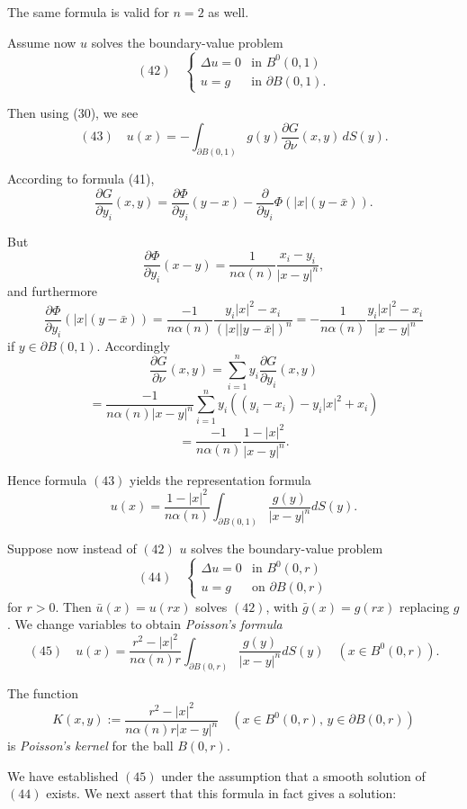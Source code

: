 The same formula is valid for $n = 2$ as well.

Assume now $u$ solves the boundary-value problem
$$(42) \quad \begin{cases} \Delta u = 0 & \text{in } B^0(0,1) \\ u = g & \text{in } \partial B(0,1). \end{cases}$$

Then using (30), we see
$$(43) \quad u(x) = -\int_{\partial B(0,1)} g(y) \frac{\partial G}{\partial \nu}(x, y) \, dS(y).$$

According to formula (41),
$$\frac{\partial G}{\partial y_i}(x, y) = \frac{\partial \Phi}{\partial y_i}(y - x) - \frac{\partial}{\partial y_i}\Phi(|x|(y - \bar{x})).$$

But
$$\frac{\partial \Phi}{\partial y_i}(x - y) = \frac{1}{n\alpha(n)} \frac{x_i - y_i}{|x - y|^n},$$
and furthermore
$$\frac{\partial \Phi}{\partial y_i}(|x|(y - \bar{x})) = \frac{-1}{n\alpha(n)} \frac{y_i|x|^2 - x_i}{(|x||y - \bar{x}|)^n} = -\frac{1}{n\alpha(n)} \frac{y_i|x|^2 - x_i}{|x - y|^n}$$
if $y \in \partial B(0, 1)$. Accordingly
$$\frac{\partial G}{\partial \nu}(x, y) = \sum_{i=1}^{n} y_i \frac{\partial G}{\partial y_i}(x, y)$$
$$= \frac{-1}{n\alpha(n)|x - y|^n} \sum_{i=1}^{n} y_i((y_i - x_i) - y_i|x|^2 + x_i)$$
$$= \frac{-1}{n\alpha(n)} \frac{1 - |x|^2}{|x - y|^n}.$$

Hence formula $(43)$ yields the representation formula
$$u(x) = \frac{1 - |x|^2}{n\alpha(n)} \int_{\partial B(0,1)} \frac{g(y)}{|x - y|^n} dS(y).$$

Suppose now instead of $(42)$ $u$ solves the boundary-value problem
$$(44) \quad \begin{cases} \Delta u = 0 & \text{in } B^0(0, r) \\ u = g & \text{on } \partial B(0,r) \end{cases}$$
for $r > 0$. Then $\bar{u}(x) = u(rx)$ solves $(42)$, with $\bar{g}(x) = g(rx)$ replacing $g$. We change variables to obtain \textit{Poisson's formula}
$$(45) \quad u(x) = \frac{r^2 - |x|^2}{n\alpha(n)r} \int_{\partial B(0,r)} \frac{g(y)}{|x - y|^n} dS(y) \quad (x \in B^0(0, r)).$$

The function
$$K(x,y) := \frac{r^2 - |x|^2}{n\alpha(n)r |x - y|^n} \quad (x \in B^0(0,r), \, y \in \partial B(0,r))$$
is \textit{Poisson's kernel} for the ball $B(0,r)$.

We have established $(45)$ under the assumption that a smooth solution of $(44)$ exists. We next assert that this formula in fact gives a solution:

